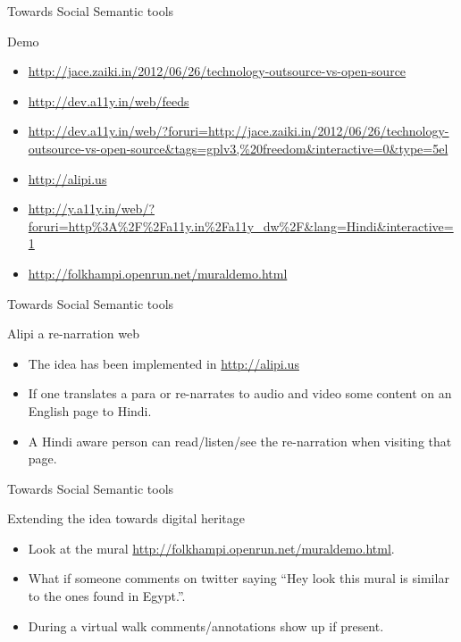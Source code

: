 \documentclass[''urlcolor=red'']{beamer}
\begin{document}
\begin{frame}{Towards Social Semantic tools}
  \begin{block}{Demo}
    \begin{itemize}
    \item \url{http://jace.zaiki.in/2012/06/26/technology-outsource-vs-open-source}
    \item \url{http://dev.a11y.in/web/feeds}
    \item \url{http://dev.a11y.in/web/?foruri=http://jace.zaiki.in/2012/06/26/technology-outsource-vs-open-source&tags=gplv3,\%20freedom&interactive=0&type=5el}
    \item \url{http://alipi.us}
    \item \url{http://y.a11y.in/web/?foruri=http\%3A\%2F\%2Fa11y.in\%2Fa11y_dw\%2F&lang=Hindi&interactive=1}
    \item \url{http://folkhampi.openrun.net/muraldemo.html}
    \end{itemize}
  \end{block}
\end{frame}


\begin{frame}{Towards Social Semantic tools}
  \begin{block}{Alipi a re-narration web}
    \begin{itemize}
    \item The idea has been implemented in \url{http://alipi.us}
    \item If one translates a para or re-narrates to audio and video some content on an English page to Hindi.
    \item A Hindi aware person can read/listen/see the re-narration when visiting that page.
    \end{itemize}
 \end{block}
\end{frame}

\begin{frame}{Towards Social Semantic tools}
  \begin{block}{Extending the idea towards digital heritage}
    \begin{itemize}
    \item Look at the mural \url{http://folkhampi.openrun.net/muraldemo.html}.
    \item What if someone comments on twitter saying ``Hey look this mural is similar to the ones found in Egypt.''.
    \item During a virtual walk comments/annotations show up if present.
    \end{itemize}
  \end{block}
\end{frame}
\end{document}
